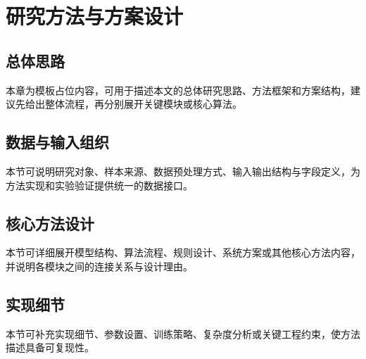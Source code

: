 \section{研究方法与方案设计}\label{chap:method}

\subsection{总体思路}

本章为模板占位内容，可用于描述本文的总体研究思路、方法框架和方案结构，建议先给出整体流程，再分别展开关键模块或核心算法。

\subsection{数据与输入组织}

本节可说明研究对象、样本来源、数据预处理方式、输入输出结构与字段定义，为方法实现和实验验证提供统一的数据接口。

\subsection{核心方法设计}

本节可详细展开模型结构、算法流程、规则设计、系统方案或其他核心方法内容，并说明各模块之间的连接关系与设计理由。

\subsection{实现细节}

本节可补充实现细节、参数设置、训练策略、复杂度分析或关键工程约束，使方法描述具备可复现性。
